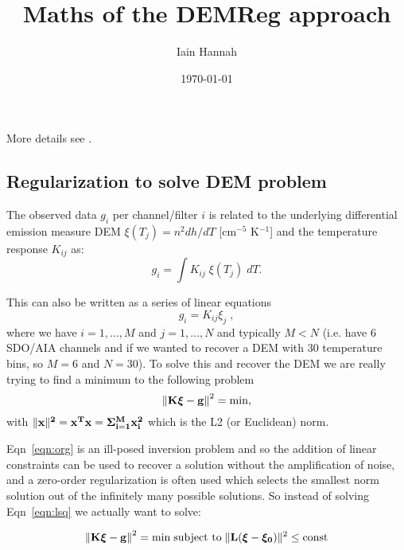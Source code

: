 \documentclass[12pt,a4paper]{article}
\title{Maths of the DEMReg approach}
\author{Iain Hannah}
\date{\today}
\begin{document}
\maketitle\thispagestyle{fancy}

More details see \citet{2012A&A...539A.146H,2013A&A...553A..10H,2004SoPh..225..293K,1992InvPr...8..849H}.

\vspace{-10pt}
\subsection*{Regularization to solve DEM problem}

The observed data $g_i$ per channel/filter $i$ is related to the underlying differential emission measure DEM $\xi(T_j)=n^2 dh/dT$ [cm$^{-5}$ K$^{-1}$] and the temperature response $K_{ij}$ as:
\begin{equation}\label{eqn:org}
    g_i=\int K_{ij}\;\xi(T_j)\; dT.
\end{equation}

This can also be written as a series of linear equations 
\begin{equation}\label{eqn:le}
    g_i=K_{ij}\xi_j\;,
\end{equation}
where we have $i=1,...,M$ and $j=1,...,N$ and typically $M<N$ (i.e. have 6 SDO/AIA channels and if we wanted to recover a DEM with 30 temperature bins, so $M=6$ and $N=30$). To solve this and recover the DEM we are really trying to find a minimum to the following problem
\begin{equation}\label{eqn:lsq}
    \left\|\bf{K\boldsymbol{\xi}-g}\right\|^2=\mbox{min},
\end{equation}
with $\|\bf{x}\|^2=\bf{x}^T\bf{x}=\Sigma_{i=1}^{M} \bf{x}_i^2$ which is the L2 (or Euclidean) norm. 

Eqn~\ref{eqn:org} is an ill-posed inversion problem and so the addition of linear constraints can be used to recover a solution without the amplification of noise, and a zero-order regularization is often used which selects the smallest norm solution out of the infinitely many possible solutions. So instead of solving Eqn~\ref{eqn:lsq} we actually want to solve:

\begin{equation}
    \left\|\bf{K\boldsymbol{\xi}-g}\right\|^2  =  \mathrm{min}  \;
\mbox{subject to} \; \| {\bf L (\boldsymbol{\xi}-\boldsymbol{\xi_0})}\|^2\le \mathrm{const}
\end{equation}
\end{document}
